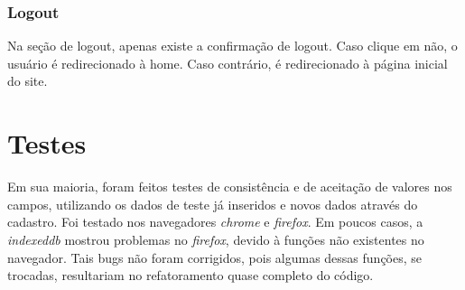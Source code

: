 \documentclass[10pt,a4paper]{article}
\begin{document}
\subsubsection{Logout}
Na seção de logout, apenas existe a confirmação de logout. Caso clique em não, o usuário é redirecionado à home. Caso contrário, é redirecionado à página inicial do site.

\section{Testes}
Em sua maioria, foram feitos testes de consistência e de aceitação de valores nos campos, utilizando os dados de teste já inseridos e novos dados através do cadastro. Foi testado nos navegadores \textit{chrome} e \textit{firefox}. Em poucos casos, a \textit{indexeddb} mostrou problemas no \textit{firefox}, devido à funções não existentes no navegador. Tais bugs não foram corrigidos, pois algumas dessas funções, se trocadas, resultariam no refatoramento quase completo do código.
\end{document}
